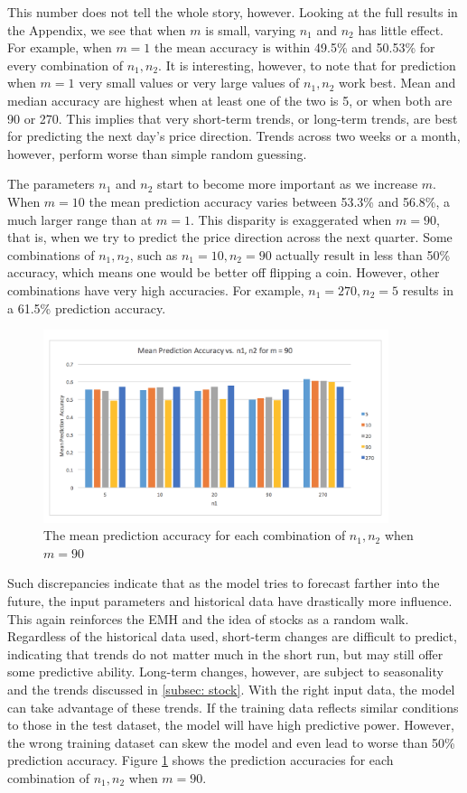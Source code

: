 \documentclass[pageno]{jpaper}
\begin{document}
This number does not tell the whole story, however. Looking at the full results in the Appendix, we see that when $m$ is small, varying $n_1$ and $n_2$ has little effect. For example, when $m=1$ the mean accuracy is within 49.5\% and 50.53\% for every combination of $n_1, n_2$. It is interesting, however, to note that for prediction when $m=1$ very small values or very large values of $n_1, n_2$ work best. Mean and median accuracy are highest when at least one of the two is 5, or when both are 90 or 270. This implies that very short-term trends, or long-term trends, are best for predicting the next day's price direction. Trends across two weeks or a month, however, perform worse than simple random guessing.

The parameters $n_1$ and $n_2$ start to become more important as we increase $m$. When $m=10$ the mean prediction accuracy varies between 53.3\% and 56.8\%, a much larger range than at $m=1$. This disparity is exaggerated when $m=90$, that is, when we try to predict the price direction across the next quarter. Some combinations of $n_1, n_2$, such as $n_1=10, n_2=90$ actually result in less than 50\% accuracy, which means one would be better off flipping a coin. However, other combinations have very high accuracies. For example, $n_1 = 270, n_2 = 5$ results in a 61.5\% prediction accuracy. 

\begin{figure}
\includegraphics[width=0.9\textwidth]{MeanAccuraciesForQuarter.png}
\caption{The mean prediction accuracy for each combination of $n_1, n_2$ when $m=90$}
\label{fig: meansforquarter}
\end{figure}

Such discrepancies indicate that as the model tries to forecast farther into the future, the input parameters and historical data have drastically more influence. This again reinforces the EMH and the idea of stocks as a random walk. Regardless of the historical data used, short-term changes are difficult to predict, indicating that trends do not matter much in the short run, but may still offer some predictive ability. Long-term changes, however, are subject to seasonality and the trends discussed in \ref{subsec: stock}. With the right input data, the model can take advantage of these trends. If the training data reflects similar conditions to those in the test dataset, the model will have high predictive power. However, the wrong training dataset can skew the model and even lead to worse than 50\% prediction accuracy. Figure \ref{fig: meansforquarter} shows the prediction accuracies for each combination of $n_1, n_2$ when $m=90$.
\end{document}
